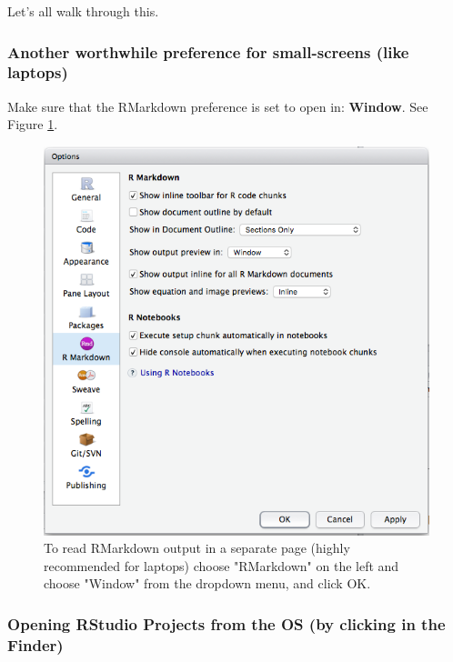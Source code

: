 \documentclass[]{book}
\theoremstyle{definition}
\theoremstyle{definition}
\theoremstyle{remark}
\begin{document}
Let's all walk through this.

\subsubsection{Another worthwhile preference for small-screens (like
laptops)}\label{another-worthwhile-preference-for-small-screens-like-laptops}

Make sure that the RMarkdown preference is set to open in:
\textbf{Window}. See Figure \ref{fig:rmd-window}.

\begin{figure}

{\centering \includegraphics[width=0.9\linewidth]{images/rmd_window} 

}

\caption{To read RMarkdown output in a separate page (highly recommended for laptops) choose "RMarkdown" on the left and choose "Window" from the dropdown menu, and click OK.}\label{fig:rmd-window}
\end{figure}

\subsubsection{Opening RStudio Projects from the OS (by clicking in the
Finder)}\label{opening-rstudio-projects-from-the-os-by-clicking-in-the-finder}
\end{document}
